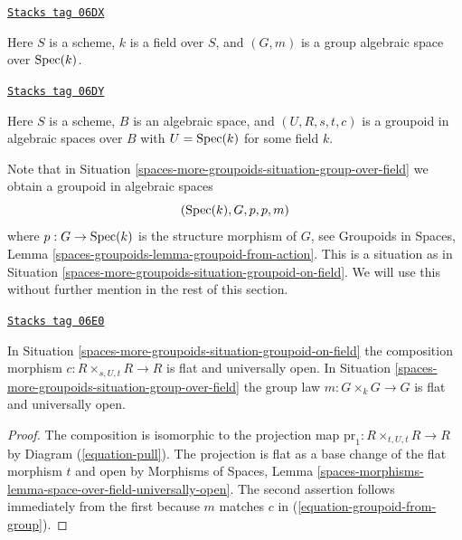\begin{definition}
\label{spaces-more-groupoids-situation-group-over-field}
\href{https://stacks.math.columbia.edu/tag/06DX}{\texttt{Stacks tag 06DX}}

Here $S$ is a scheme, $k$ is a field over $S$, and
$(G, m)$ is a group algebraic space over $\operatorname{Spec}(k)$.
\end{definition}

\begin{definition}
\label{spaces-more-groupoids-situation-groupoid-on-field}
\href{https://stacks.math.columbia.edu/tag/06DY}{\texttt{Stacks tag 06DY}}

Here $S$ is a scheme, $B$ is an algebraic space, and
$(U, R, s, t, c)$ is a groupoid in algebraic spaces over $B$
with $U = \operatorname{Spec}(k)$ for some field $k$.
\end{definition}

Note that in
Situation \ref{spaces-more-groupoids-situation-group-over-field}
we obtain a groupoid in algebraic spaces
\begin{equation}
\label{equation-groupoid-from-group}
(\operatorname{Spec}(k), G, p, p, m)
\end{equation}
where $p : G \to \operatorname{Spec}(k)$ is the structure morphism of $G$, see
Groupoids in Spaces, Lemma \ref{spaces-groupoids-lemma-groupoid-from-action}.
This is a situation as in
Situation \ref{spaces-more-groupoids-situation-groupoid-on-field}.
We will use this without further mention in the rest of this section.

\begin{lemma}
\label{spaces-more-groupoids-lemma-groupoid-on-field-open-multiplication}
\href{https://stacks.math.columbia.edu/tag/06E0}{\texttt{Stacks tag 06E0}}

In
Situation \ref{spaces-more-groupoids-situation-groupoid-on-field}
the composition morphism $c : R \times_{s, U, t} R \to R$ is flat and
universally open.
In
Situation \ref{spaces-more-groupoids-situation-group-over-field}
the group law $m : G \times_k G \to G$ is flat and
universally open.
\end{lemma}

\begin{proof}
The composition is isomorphic to the projection map
$\text{pr}_1 : R \times_{t, U, t} R \to R$ by
Diagram (\ref{equation-pull}).
The projection is flat as a base change of the flat morphism $t$
and open by
Morphisms of Spaces,
Lemma \ref{spaces-morphisms-lemma-space-over-field-universally-open}.
The second assertion follows immediately from the first because
$m$ matches $c$ in (\ref{equation-groupoid-from-group}).
\end{proof}

